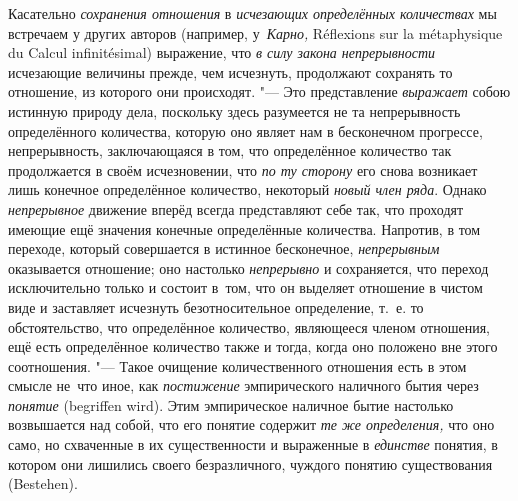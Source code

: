 Касательно {\em сохранения отношения} в
{\em исчезающих определённых количествах} мы
встречаем у других авторов (например, у~{\em Карно,}
Ré\-flexi\-ons sur la méta\-phy\-sique du Cal\-cul in\-fini\-tési\-mal)
выражение, что {\em в силу закона непрерывности} исчезающие величины прежде,
чем исчезнуть, продолжают сохранять то отношение, из которого они происходят.
"--- Это представление {\em выражает} собою истинную природу дела, поскольку
здесь разумеется не та непрерывность определённого количества, которую оно
являет нам в бесконечном прогрессе, непрерывность, заключающаяся в том, что
определённое количество так продолжается в своём исчезновении, что
{\em по ту сторону} его снова возникает лишь конечное определённое
количество, некоторый {\em новый член ряда}. Однако {\em непрерывное} движение
вперёд всегда представляют себе так, что проходят имеющие ещё значения
конечные определённые количества. Напротив, в том переходе, который совершается
в истинное бесконечное, {\em непрерывным} оказывается отношение; оно настолько
{\em непрерывно} и сохраняется, что переход исключительно только и состоит
в~том, что он выделяет отношение в чистом виде и заставляет исчезнуть
безотносительное определение, т.~е. то обстоятельство, что определённое
количество, являющееся членом отношения, ещё есть определённое количество также
и тогда, когда оно положено вне этого соотношения. "--- Такое очищение
количественного отношения есть в этом смысле не~что иное, как
{\em постижение} эмпирического наличного бытия через
{\em понятие} (be\-grif\-fen wird). Этим эмпирическое наличное бытие
настолько возвышается над собой, что его понятие содержит
{\em те же определения,} что оно само, но схваченные в их существенности и
выраженные в {\em единстве} понятия, в котором они лишились своего безразличного,
чуждого понятию существования (Bestehen).

